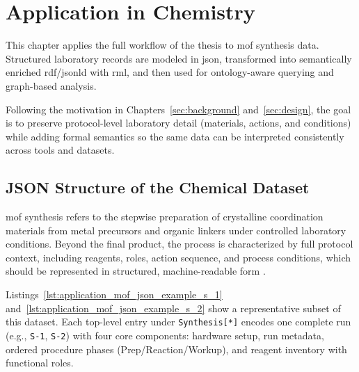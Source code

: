 \chapter{Application in Chemistry}\label{sec:application}

This chapter applies the full workflow of the thesis to \gls{mof} synthesis data. Structured laboratory records are modeled in \gls{json}, transformed into semantically enriched \gls{rdf}/\gls{jsonld} with \gls{rml}, and then used for ontology-aware querying and graph-based analysis.

Following the motivation in Chapters~\ref{sec:background} and~\ref{sec:design}, the goal is to preserve protocol-level laboratory detail (materials, actions, and conditions) while adding formal semantics so the same data can be interpreted consistently across tools and datasets.

\section{JSON Structure of the Chemical Dataset}\label{sec:application:metal:json-structure}

\gls{mof} synthesis refers to the stepwise preparation of crystalline coordination materials from metal precursors and organic linkers under controlled laboratory conditions. Beyond the final product, the process is characterized by full protocol context, including reagents, roles, action sequence, and process conditions, which should be represented in structured, machine-readable form \cite{neubauer2026data}.

Listings~\ref{lst:application_mof_json_example_s_1} and~\ref{lst:application_mof_json_example_s_2} show a representative subset of this dataset. Each top-level entry under \texttt{Synthesis[*]} encodes one complete run (e.g., \texttt{S-1}, \texttt{S-2}) with four core components: hardware setup, run metadata, ordered procedure phases (Prep/Reaction/Workup), and reagent inventory with functional roles.

